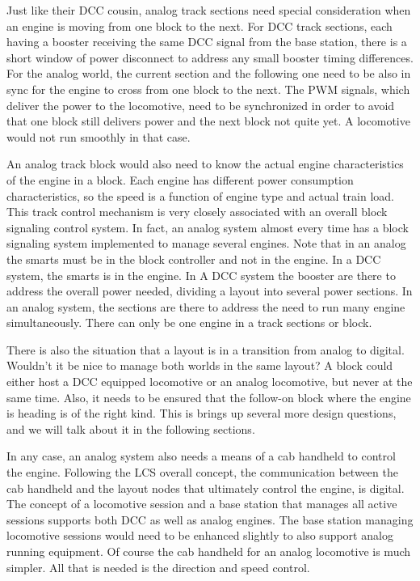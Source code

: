 Just like their DCC cousin, analog track sections need special consideration when an engine is moving from one block to the next. For DCC track sections, each having a booster receiving the same DCC signal from the base station, there is a short window of power disconnect to address any small booster timing differences. For the analog world, the current section and the following one need to be also in sync for the engine to cross from one block to the next. The PWM signals, which deliver the power to the locomotive, need to be synchronized in order to avoid that one block still delivers power and the next block not quite yet. A locomotive would not run smoothly in that case.

An analog track block would also need to know the actual engine characteristics of the engine in a block. Each engine has different power consumption characteristics, so the speed is a function of engine type and actual train load. This track control mechanism is very closely associated with an overall block signaling control system. In fact, an analog system almost every time has a block signaling system implemented to manage several engines. Note that in an analog the smarts must be in the block controller and not in the engine. In a DCC system, the smarts is in the engine. In A DCC system the booster are there to address the overall power needed, dividing a layout into several power sections. In an analog system, the sections are there to address the need to run many engine simultaneously. There can only be one engine in a track sections or block.

There is also the situation that a layout is in a transition from analog to digital. Wouldn't it be nice to manage both worlds in the same layout? A block could either host a DCC equipped locomotive or an analog locomotive, but never at the same time. Also, it needs to be ensured that the follow-on block where the engine is heading is of the right kind. This is brings up several more design questions, and we will talk about it in the following sections.

In any case, an analog system also needs a means of a cab handheld to control the engine. Following the LCS overall concept, the communication between the cab handheld and the layout nodes that ultimately control the engine, is digital. The concept of a locomotive session and a base station that manages all active sessions supports both DCC as well as analog engines. The base station managing locomotive sessions would need to be enhanced slightly to also support analog running equipment. Of course the cab handheld for an analog locomotive is much simpler. All that is needed is the direction and speed control.

